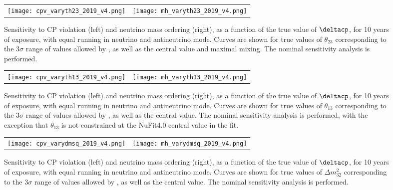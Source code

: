 \begin{figure}[h!]
    \centering
    \begin{tabular}{cc}
		\texttt{[image: cpv\_varyth23\_2019\_v4.png]} &
		\texttt{[image: mh\_varyth23\_2019\_v4.png]}
	\end{tabular}
	\caption[Sensitivity to CP violation and neutrino mass ordering, as a function of $\deltacp$]{Sensitivity to CP violation (left) and neutrino mass ordering (right), as a function of the true value of $\deltacp$, for 10 years of exposure, with equal running in neutrino and antineutrino mode. Curves are shown for true values of $\theta_{23}$ corresponding to the 3$\sigma$ range of values allowed by , as well as the  central value and maximal mixing. The nominal sensitivity analysis is performed.}
    \label{fig:th23var}
\end{figure}

\begin{figure}[h!]
    \centering
    \begin{tabular}{cc}
		\texttt{[image: cpv\_varyth13\_2019\_v4.png]} &
		\texttt{[image: mh\_varyth13\_2019\_v4.png]}
	\end{tabular}
	\caption[Sensitivity to CP violation and neutrino mass ordering, as a function of $\deltacp$]{Sensitivity to CP violation (left) and neutrino mass ordering (right), as a function of the true value of $\deltacp$, for 10 years of exposure, with equal running in neutrino and antineutrino mode. Curves are shown for true values of $\theta_{13}$ corresponding to the 3$\sigma$ range of values allowed by , as well as the  central value. The nominal sensitivity analysis is performed, with the exception that $\theta_{13}$ is not constrained at the NuFit4.0 central value in the fit.}
    \label{fig:th13var}
\end{figure}

\begin{figure}[h!]
    \centering
    \begin{tabular}{cc}
		\texttt{[image: cpv\_varydmsq\_2019\_v4.png]} &
		\texttt{[image: mh\_varydmsq\_2019\_v4.png]}
	\end{tabular}
	\caption[Sensitivity to CP violation and neutrino mass ordering, as a function of $\deltacp$]{Sensitivity to CP violation (left) and neutrino mass ordering (right), as a function of the true value of $\deltacp$, for 10 years of exposure, with equal running in neutrino and antineutrino mode. Curves are shown for true values of $\Delta m^2_{32}$ corresponding to the 3$\sigma$ range of values allowed by , as well as the  central value. The nominal sensitivity analysis is performed.}
    \label{fig:dmsqvar}
\end{figure}

